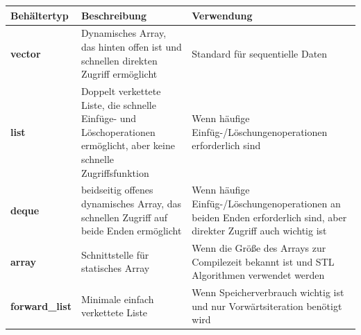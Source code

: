 \documentclass[12pt]{scrartcl}
\begin{document}
\begin{table}[H]
	\centering
	\begin{tabular}{ p{2.5cm} | p{7cm} | p{5cm} }
		Behältertyp            & Beschreibung
		                       & Verwendung                                                                        \\
		\hline
		\textbf{vector}        & Dynamisches Array, das hinten offen ist und schnellen direkten Zugriff ermöglicht
		                       & Standard für sequentielle Daten                                                   \\
		\hline
		\textbf{list}          & Doppelt verkettete Liste, die schnelle Einfüge-
		und Löschoperationen ermöglicht, aber keine schnelle Zugriffsfunktion
		                       & Wenn häufige Einfüg-/Löschungenoperationen erforderlich sind
		\\
		\hline
		\textbf{deque}         & beidseitig offenes dynamisches Array, das schnellen Zugriff
		auf beide Enden ermöglicht
		                       & Wenn häufige Einfüg-/Löschungenoperationen an beiden Enden erforderlich sind,
		aber direkter Zugriff auch wichtig ist                                                                     \\
		\hline
		\textbf{array}         & Schnittstelle für statisches Array
		                       & Wenn die Größe des Arrays zur Compilezeit bekannt ist und
		STL Algorithmen verwendet werden                                                                           \\
		\hline
		\textbf{forward\_list} & Minimale einfach verkettete Liste
		                       & Wenn Speicherverbrauch wichtig ist und nur Vorwärtsiteration benötigt wird        \\
	\end{tabular}
\end{table}
\end{document}
